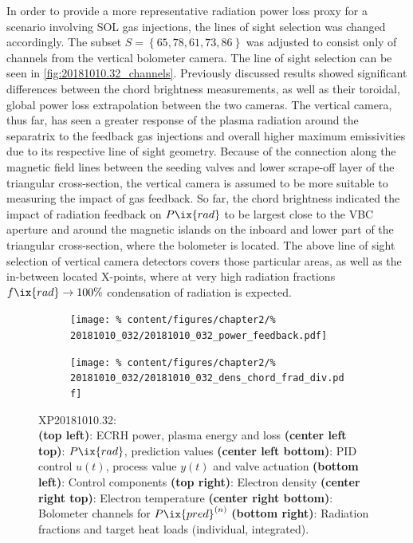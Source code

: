 %
            In order to provide a more representative radiation power loss proxy for a scenario involving SOL gas injections, the lines of sight selection was changed accordingly. The subset $S=\left\{65, 78, 61, 73, 86\right\}$ was adjusted to consist only of channels from the vertical bolometer camera. The line of sight selection can be seen in \cref{fig:20181010.32_channels}. Previously discussed results showed significant differences between the chord brightness measurements, as well as their toroidal, global power loss extrapolation between the two cameras. The vertical camera, thus far, has seen a greater response of the plasma radiation around the separatrix to the feedback gas injections and overall higher maximum emissivities due to its respective line of sight geometry. Because of the connection along the magnetic field lines between the seeding valves and lower scrape-off layer of the triangular cross-section, the vertical camera is assumed to be more suitable to measuring the impact of gas feedback. So far, the chord brightness indicated the impact of radiation feedback on $P\ix{rad}$ to be largest close to the VBC aperture and around the magnetic islands on the inboard and lower part of the triangular cross-section, where the bolometer is located. The above line of sight selection of vertical camera detectors covers those particular areas, as well as the in-between located X-points, where at very high radiation fractions $f\ix{rad}\rightarrow100\%$ condensation of radiation is expected.\\%
%
            \begin{figure}%
                \centering%
                \begin{subfigure}{.48\textwidth}%
                    \centering%
                    \texttt{[image: \%
                        content/figures/chapter2/\%
                        20181010\_032/20181010\_032\_power\_feedback.pdf]}%
                \end{subfigure}%
                \hfill%
                \begin{subfigure}{.48\textwidth}%
                    \centering%
                    \texttt{[image: \%
                        content/figures/chapter2/\%
                        20181010\_032/20181010\_032\_dens\_chord\_frad\_div.pdf]}%
                \end{subfigure}%
                \caption{%
                    XP20181010.32:\\%
                    \textbf{(top left)}: ECRH power, plasma energy and loss \textbf{(center left top)}: $P\ix{rad}$, prediction values \textbf{(center left bottom)}: PID control $u\left(t\right)$, process value $y\left(t\right)$ and valve actuation \textbf{(bottom left)}: Control components \textbf{(top right)}: Electron density \textbf{(center right top)}: Electron temperature \textbf{(center right bottom)}: Bolometer channels for $P\ix{pred}^{\left(n\right)}$ \textbf{(bottom right)}: Radiation fractions and target heat loads (individual, integrated).}\label{fig:20181010.32_PDF}%
            \end{figure}%
